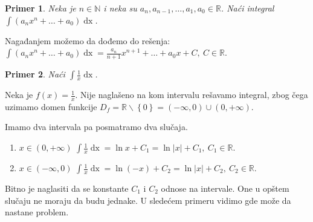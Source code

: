 \documentclass{article}
\newtheorem{prim}{Primer}[section]
\DeclareMathOperator{\dx}{dx}
\begin{document}
\begin{primbox}
    \label{primer_1.3}
    \begin{prim}
        Neka je $n \in \mathbb{N}$ i neka su $a_n, a_{n-1},
            \dotsc, a_1, a_0 \in \mathbb{R}$. Naći integral
        $\displaystyle\int \left(a_n  x^n + \dotsc + a_0\right)\dx$.
    \end{prim}
    Nagađanjem možemo da dođemo do rešenja:
    $\displaystyle\int \left(a_n  x^n + \dotsc + a_0\right)\dx=\frac{a_n}{n+1}x^{n+1} + \dotsc +
        a_0x + C,\ C\in\mathbb{R}$.
\end{primbox}

\begin{primbox}
    \label{primer_1.4}
    \begin{prim}
        Naći $\displaystyle\int\frac{1}{x}\dx$.
    \end{prim}
    Neka je $\displaystyle f\left(x\right) = \frac{1}{x}$.
    Nije naglašeno na kom intervalu rešavamo integral, zbog čega uzimamo domen
    funkcije
    $D_f= \mathbb{R}\backslash \left\{0\right\} = \left(-\infty, 0\right)\cup\left(0, +\infty\right)$.\par
    Imamo dva intervala pa posmatramo dva slučaja.
    \begin{enumerate}[leftmargin=2cm, label=\arabic*. slučaj:]
        \item $x \in \left(0, +\infty\right)$ $\displaystyle\int \frac{1}{x}\dx =
                  \ln x + C_1=\ln|x| + C_1,\ C_1\in\mathbb{R}$.
        \item $x \in \left(-\infty, 0\right)$ $\displaystyle\int \frac{1}{x}\dx =
                  \ln\left(-x\right) + C_2=\ln|x| + C_2,\ C_2\in\mathbb{R}$.
    \end{enumerate}
\end{primbox}

Bitno je naglasiti da se konstante $C_1$ i $C_2$ odnose na intervale. One
u opštem slučaju ne moraju da budu jednake.
U sledećem primeru vidimo gde može da nastane problem.
\end{document}
